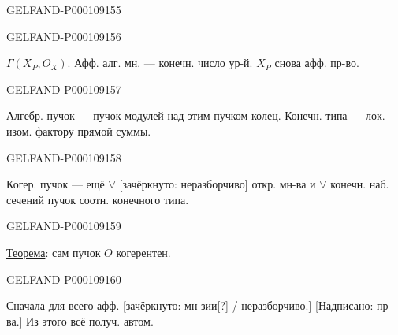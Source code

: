 \begin{GelfandAdjacentEvidence}{GELFAND-P000109}{155}

\end{GelfandAdjacentEvidence}
\begin{GelfandAdjacentEvidence}{GELFAND-P000109}{156}


$\Gamma(X_P,O_X)$. Афф. алг. мн. — конечн. число ур-й.
$X_P$ снова афф. пр-во.
\end{GelfandAdjacentEvidence}
\begin{GelfandAdjacentEvidence}{GELFAND-P000109}{157}


Алгебр. пучок — пучок модулей над этим пучком колец.
Конечн. типа — лок. изом. фактору прямой суммы.
\end{GelfandAdjacentEvidence}
\begin{GelfandAdjacentEvidence}{GELFAND-P000109}{158}

Когер. пучок — ещё $\forall$ [зачёркнуто: неразборчиво] откр. мн-ва и $\forall$ конечн. наб. сечений пучок соотн. конечного типа.
\end{GelfandAdjacentEvidence}
\begin{GelfandAdjacentEvidence}{GELFAND-P000109}{159}

\underline{Теорема}: сам пучок $O$ когерентен.
\end{GelfandAdjacentEvidence}
\begin{GelfandAdjacentEvidence}{GELFAND-P000109}{160}


Сначала для всего афф. [зачёркнуто: мн-зии[?] / неразборчиво.] [Надписано: пр-ва.] Из этого всё получ. автом.
\end{GelfandAdjacentEvidence}
